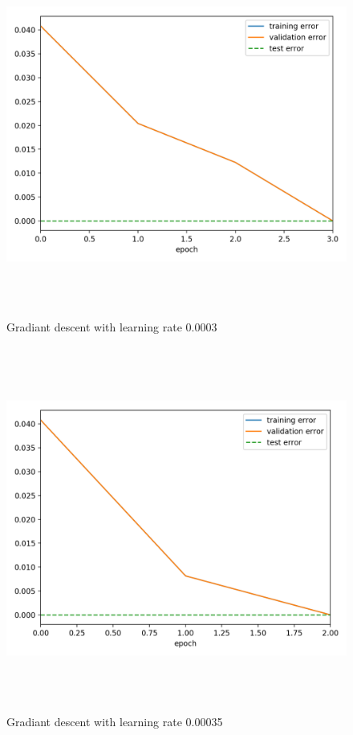 \documentclass[a4paper]{article}
\begin{document}
\begin{figure}[h]
\caption{Gradiant descent with learning rate 0.0003}
\centering
\includegraphics[width=15cm, height=12cm]{GD_LR0003}
\end{figure}

\begin{figure}[h]
\caption{Gradiant descent with learning rate 0.00035}
\centering
\includegraphics[width=15cm, height=12cm]{GD_LR00035}
\end{figure}
\end{document}
